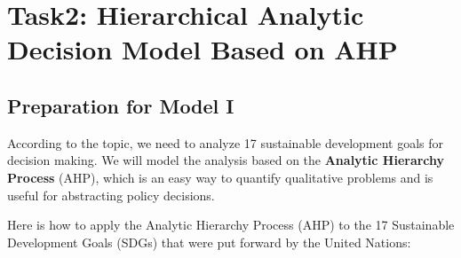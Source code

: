 \section{Task2: Hierarchical Analytic Decision Model Based on AHP}

\subsection{Preparation for Model I}
According to the topic, we need to analyze 17 sustainable development goals for decision making. We will model the analysis based on the \textbf{Analytic Hierarchy Process} (AHP), which is an easy way to quantify qualitative problems and is useful for abstracting policy decisions.

Here is how to apply the Analytic Hierarchy Process (AHP) to the 17 Sustainable Development Goals (SDGs) that were put forward by the United Nations:

